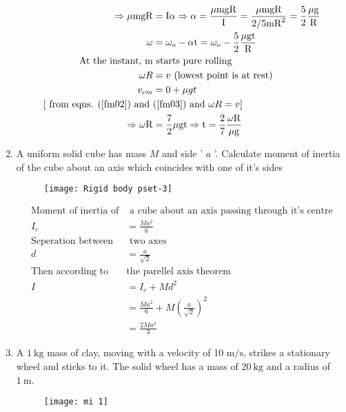 \begin{enumerate}[label=\color{ocre}\textbf{\arabic*.}]
\begin{answer}
\begin{align}
	\Rightarrow \mu \mathrm{mgR}&=\mathrm{I} \alpha \Rightarrow \alpha=\frac{\mu \mathrm{mgR}}{\mathrm{I}}=\frac{\mu \mathrm{mgR}}{2 / 5 \mathrm{mR}^{2}}=\frac{5}{2} \frac{\mu \mathrm{g}}{\mathrm{R}}\notag\\
	\omega&=\omega_{\mathrm{o}}-\alpha \mathrm{t}=\omega_{\mathrm{o}}-\frac{5}{2} \frac{\mu \mathrm{gt}}{\mathrm{R}}\label{fm02}\\
	\text{At the instant, $\mathrm{m}$}&\text{ starts pure rolling}\notag\\
	\omega R&=v\text{ (lowest point is at rest)}\notag\\
	v_{c m}&=0+\mu g t\label{fm03}\\
	\text{$[$ from eqns. $(\ref{fm02})$ and }&\text{$(\ref{fm03})$ and $\omega R=v]$}\notag\\
	\Rightarrow \omega \mathrm{R}&=\frac{7}{2} \mu \mathrm{gt} \Rightarrow \mathrm{t}=\frac{2}{7} \frac{\omega \mathrm{R}}{\mu \mathrm{g}}\notag
	\end{align}
\end{answer}
\item  A uniform solid cube has mass $M$ and side ' $a$ '. Calculate moment of inertia of the cube about an axis which coincides with one of it's sides
\begin{figure}[H]
	\centering
	\texttt{[image: Rigid body pset-3]}
\end{figure}
\begin{answer}
	\begin{align*}
	\text{Moment of inertia of}&\text{ a cube about an axis passing through it's  centre}\\
	I_{c}&=\frac{Ma^{2}}{6}\\
	\text{Seperation between}&\text{ two axes}\\
	d&=\frac{a}{\sqrt{2}}\\
	\text{Then according to }&\text{the parellel axis theorem}\\
	I&=I_{c}+Md^{2}\\
		&=\frac{Ma^{2}}{6}+M\left( {\frac{a}{\sqrt{2}}}\right) ^{2}\\
		&=\frac{2 Ma^{2}}{3}
	\end{align*}
\end{answer}
 \item A $1 \mathrm{~kg}$ mass of clay, moving with a velocity of 10 $\mathrm{m} / \mathrm{s}$, strikes a stationary wheel and sticks to it. The solid wheel has a mass of $20 \mathrm{~kg}$ and a radius of $1 \mathrm{~m}$.
\begin{figure}[H]
	\centering
	\texttt{[image: mi 1]}
	

\end{figure}
\end{enumerate}
